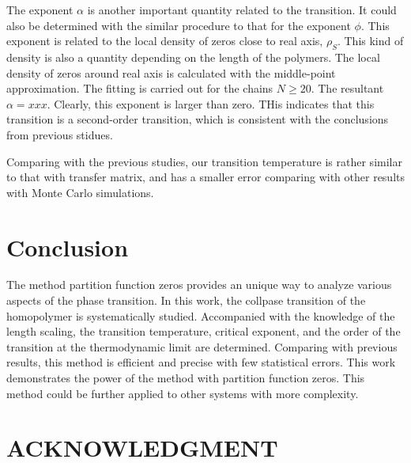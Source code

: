 \documentclass[preprint,preprintnumbers,amsmath,amssymb,showpacs,aps,pre]{revtex4-1}
\begin{document}
The exponent $\alpha$ is another important quantity related to the transition. It
could also be determined with the similar procedure to that for the exponent $\phi$.
This exponent is related to the local density of zeros close to real axis, $\rho_S$.
This kind of density is also a quantity depending on the length of the polymers. 
The local density of zeros around real axis is calculated with the middle-point
approximation. The fitting is carried out for the chains $N\ge 20$. The
resultant $\alpha=xxx$. Clearly, this exponent is larger than zero. THis
indicates that this transition is a second-order transition, which is
consistent with the conclusions from previous stidues.

Comparing with the previous studies, our transition temperature is rather
similar to that with transfer matrix, and has a smaller error comparing with
other results with Monte Carlo simulations. 

\section{Conclusion}

The method partition function zeros provides an unique way to analyze various
aspects of the phase transition. In this work, the collpase transition of the
homopolymer is systematically studied. Accompanied with the knowledge of the
length scaling, the transition temperature, critical exponent, and the order
of the transition at the thermodynamic limit are determined. Comparing with
previous results, this method is efficient and precise with few statistical
errors. This work demonstrates the power of the method with partition function
zeros. This method could be further applied to other systems with more
complexity.

\section*{ACKNOWLEDGMENT}
\end{document}

